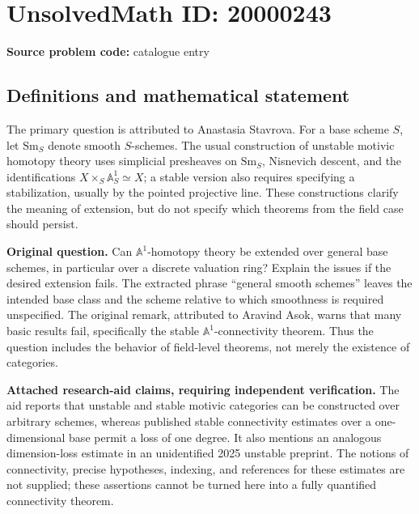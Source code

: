\documentclass[11pt]{article}
\newcommand{\A}{\mathbb{A}}
\begin{document}
\section*{UnsolvedMath ID: 20000243}
\textbf{Source problem code:} catalogue entry
\subsection{Definitions and mathematical statement}
The primary question is attributed to Anastasia Stavrova. For a base scheme $S$, let $\mathrm{Sm}_S$ denote smooth $S$-schemes. The usual construction of unstable motivic homotopy theory uses simplicial presheaves on $\mathrm{Sm}_S$, Nisnevich descent, and the identifications $X\times_S\A^1_S\simeq X$; a stable version also requires specifying a stabilization, usually by the pointed projective line. These constructions clarify the meaning of extension, but do not specify which theorems from the field case should persist.

\textbf{Original question.} Can $\A^1$-homotopy theory be extended over general base schemes, in particular over a discrete valuation ring? Explain the issues if the desired extension fails. The extracted phrase ``general smooth schemes'' leaves the intended base class and the scheme relative to which smoothness is required unspecified. The original remark, attributed to Aravind Asok, warns that many basic results fail, specifically the stable $\A^1$-connectivity theorem. Thus the question includes the behavior of field-level theorems, not merely the existence of categories.

\textbf{Attached research-aid claims, requiring independent verification.} The aid reports that unstable and stable motivic categories can be constructed over arbitrary schemes, whereas published stable connectivity estimates over a one-dimensional base permit a loss of one degree. It also mentions an analogous dimension-loss estimate in an unidentified 2025 unstable preprint. The notions of connectivity, precise hypotheses, indexing, and references for these estimates are not supplied; these assertions cannot be turned here into a fully quantified connectivity theorem.
\end{document}
